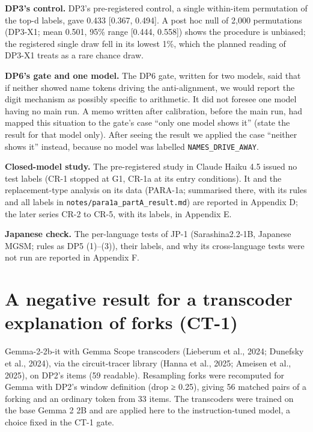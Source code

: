 \documentclass[
  10pt,
  a4paper,
]{article}
\begin{document}
\textbf{DP3's control.} DP3's pre-registered control, a single within-item permutation of the top-d labels, gave 0.433 {[}0.367, 0.494{]}. A post hoc null of 2,000 permutations (DP3-X1; mean 0.501,
95\% range {[}0.444, 0.558{]}) shows the procedure is unbiased; the registered single draw fell in its lowest 1\%, which the planned reading of DP3-X1 treats as a rare chance draw.

\textbf{DP6's gate and one model.} The DP6 gate, written for two models, said that if neither showed name tokens driving the anti-alignment, we would report the digit mechanism as possibly specific to
arithmetic. It did not foresee one model having no main run. A memo written after calibration, before the main run, had mapped this situation to the gate's case ``only one model shows it'' (state the
result for that model only). After seeing the result we applied the case ``neither shows it'' instead, because no model was labelled \texttt{NAMES\_\allowbreak{}DRIVE\_\allowbreak{}AWAY}.

\textbf{Closed-model study.} The pre-registered study in Claude Haiku 4.5 issued no test labels (CR-1 stopped at G1, CR-1a at its entry conditions). It and the replacement-type analysis on its data
(PARA-1a; summarised there, with its rules and all labels in \texttt{notes/para1a\_\allowbreak{}partA\_\allowbreak{}result.md}) are reported in Appendix D; the later series CR-2 to CR-5, with its labels, in Appendix E.

\textbf{Japanese check.} The per-language tests of JP-1 (Sarashina2.2-1B, Japanese MGSM; rules as DP5 (1)--(3)), their labels, and why its cross-language tests were not run are reported in Appendix F.

\hypertarget{a-negative-result-for-a-transcoder-explanation-of-forks-ct-1}{%
\section{A negative result for a transcoder explanation of forks (CT-1)}\label{a-negative-result-for-a-transcoder-explanation-of-forks-ct-1}}

Gemma-2-2b-it with Gemma Scope transcoders (Lieberum et al., 2024; Dunefsky et al., 2024), via the circuit-tracer library (Hanna et al., 2025; Ameisen et al., 2025), on DP2's items (59 readable).
Resampling forks were recomputed for Gemma with DP2's window definition (drop ≥ 0.25), giving 56 matched pairs of a forking and an ordinary token from 33 items. The transcoders were trained on the
base Gemma 2 2B and are applied here to the instruction-tuned model, a choice fixed in the CT-1 gate.
\end{document}
